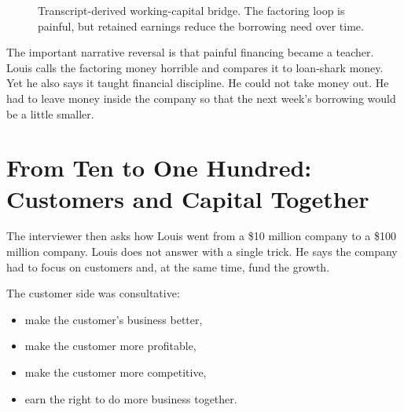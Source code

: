 \begin{figure}
\centering
{}
\caption{Transcript-derived working-capital bridge. The factoring loop is painful, but retained earnings reduce the borrowing need over time.}
\end{figure}

The important narrative reversal is that painful financing became a teacher. Louis calls the factoring money horrible and compares it to loan-shark money. Yet he also says it taught financial discipline. He could not take money out. He had to leave money inside the company so that the next week's borrowing would be a little smaller.

\section{From Ten to One Hundred: Customers and Capital Together}

The interviewer then asks how Louis went from a \$10 million company to a \$100 million company. Louis does not answer with a single trick. He says the company had to focus on customers and, at the same time, fund the growth.

The customer side was consultative:
\begin{itemize}
\item make the customer's business better,
\item make the customer more profitable,
\item make the customer more competitive,
\item earn the right to do more business together.
\end{itemize}

